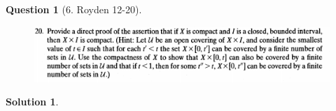 \documentclass{article} %
\theoremstyle{quest}
\newtheorem*{question}{Question}
\newtheorem*{solution}{Solution}
\begin{document}
\pagebreak

\begin{question}[6. Royden 12-20]
\hfill
\begin{figure}[h!]
  \centering
    \includegraphics[width=1\textwidth]{12-20}
\end{figure}
\end{question}
\begin{solution}
\end{solution}
\end{document}
